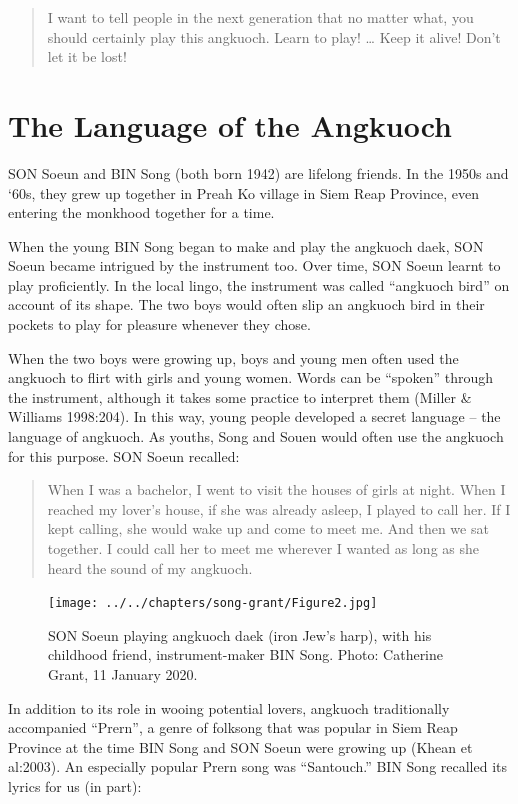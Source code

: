 \documentclass[twoside]{article}
\begin{document}
\begin{quote}
I want to tell people in the next generation that no matter what, you
should certainly play this angkuoch. Learn to play! \ldots{} Keep it
alive! Don't let it be lost!
\end{quote}

\hypertarget{the-language-of-the-angkuoch}{%
\section*{The Language of the
Angkuoch}\label{the-language-of-the-angkuoch}}

SON Soeun and BIN Song (both born 1942) are lifelong friends. In the
1950s and `60s, they grew up together in Preah Ko village in Siem Reap
Province, even entering the monkhood together for a time.

When the young BIN Song began to make and play the angkuoch daek, SON
Soeun became intrigued by the instrument too. Over time, SON Soeun
learnt to play proficiently. In the local lingo, the instrument was
called ``angkuoch bird'' on account of its shape. The two boys would
often slip an angkuoch bird in their pockets to play for pleasure
whenever they chose.

When the two boys were growing up, boys and young men often used the
angkuoch to flirt with girls and young women. Words can be ``spoken''
through the instrument, although it takes some practice to interpret
them (Miller \& Williams 1998:204). In this way, young people developed
a secret language -- the language of angkuoch. As youths, Song and Souen
would often use the angkuoch for this purpose. SON Soeun recalled:

\begin{quote}
When I was a bachelor, I went to visit the houses of girls at night.
When I reached my lover's house, if she was already asleep, I played to
call her. If I kept calling, she would wake up and come to meet me. And
then we sat together. I could call her to meet me wherever I wanted as
long as she heard the sound of my angkuoch.
\end{quote}

\begin{figure}[ht]
  \texttt{[image: ../../chapters/song-grant/Figure2.jpg]}
  \caption{SON Soeun playing angkuoch
  daek (iron Jew's harp), with his childhood friend, instrument-maker BIN
  Song. Photo: Catherine Grant, 11 January 2020.}
\end{figure}

In addition to its role in wooing potential lovers, angkuoch
traditionally accompanied ``Prern'', a genre of folksong that was
popular in Siem Reap Province at the time BIN Song and SON Soeun were
growing up (Khean et al:2003). An especially popular Prern song was
``Santouch.'' BIN Song recalled its lyrics for us (in part):
\end{document}
